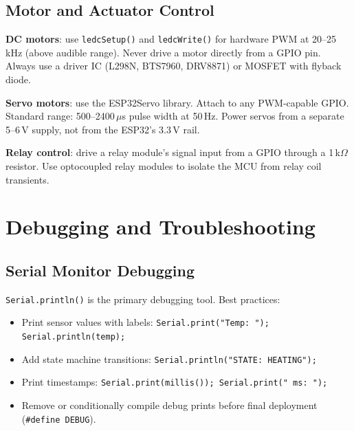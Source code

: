 \subsection{Motor and Actuator Control}
\textbf{DC motors}: use \texttt{ledcSetup()} and \texttt{ledcWrite()} for hardware PWM at 20--25\,kHz (above audible range). Never drive a motor directly from a GPIO pin. Always use a driver IC (L298N, BTS7960, DRV8871) or MOSFET with flyback diode.

\textbf{Servo motors}: use the ESP32Servo library. Attach to any PWM-capable GPIO. Standard range: 500--2400\,$\mu$s pulse width at 50\,Hz. Power servos from a separate 5--6\,V supply, not from the ESP32's 3.3\,V rail.

\textbf{Relay control}: drive a relay module's signal input from a GPIO through a 1\,k$\Omega$ resistor. Use optocoupled relay modules to isolate the MCU from relay coil transients.

\section{Debugging and Troubleshooting}

\subsection{Serial Monitor Debugging}
\texttt{Serial.println()} is the primary debugging tool. Best practices:
\begin{itemize}[nosep,leftmargin=1.5em]
\item Print sensor values with labels: \texttt{Serial.print("Temp: "); Serial.println(temp);}
\item Add state machine transitions: \texttt{Serial.println("STATE: HEATING");}
\item Print timestamps: \texttt{Serial.print(millis()); Serial.print(" ms: ");}
\item Remove or conditionally compile debug prints before final deployment (\texttt{\#define DEBUG}).
\end{itemize}

